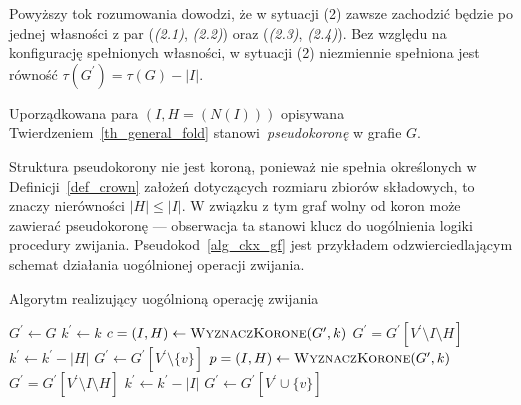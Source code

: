 {\begin{bproof}
\begin{itemize}
      Powyższy tok rozumowania dowodzi, że w sytuacji (2) zawsze zachodzić będzie po jednej własności z par (\textit{(2.1)}, \textit{(2.2)}) oraz (\textit{(2.3)}, \textit{(2.4)}).
      Bez względu na konfigurację spełnionych własności, w sytuacji (2) niezmiennie spełniona jest równość $\tau(G^\prime)=\tau(G)-|I|$.
    \end{itemize}
  \end{bproof}

  \begin{definition}
    Uporządkowana para $(I, H=(N(I)))$ opisywana Twierdzeniem~\ref{th_general_fold} stanowi~\emph{pseudokoronę} w grafie $G$.
  \end{definition}

  Struktura pseudokorony nie jest koroną, ponieważ nie spełnia określonych w Definicji~\ref{def_crown} założeń dotyczących rozmiaru zbiorów składowych, to znaczy nierówności $|H| \leq |I|$.
  W związku z tym graf wolny od koron może zawierać pseudokoronę --- obserwacja ta stanowi klucz do uogólnienia logiki procedury zwijania.
  Pseudokod~\ref{alg_ckx_gf} jest przykładem odzwierciedlającym schemat działania uogólnionej operacji zwijania.
  \begin{algorithm}
    \caption{Algorytm realizujący uogólnioną operację zwijania}\label{alg_ckx_gf}
    \begin{algorithmic}[1]


        \State $G^\prime \gets G$
        \State $k^\prime \gets k$
        \State $c=(I, H) \gets \Call{WyznaczKorone}{G^\prime, k}$
          \State $G^\prime = G^\prime[V^\prime \setminus I \setminus H]$
          \State $k^\prime \gets k^\prime - |H|$
        \EndWhile
          \State $G^\prime \gets G^\prime[V^\prime \setminus \{v\}]$
          \State $p=(I, H) \gets \Call{WyznaczKorone}{G^\prime, k}$
            \State $G^\prime = G^\prime[V^\prime \setminus I \setminus H]$
            \State $k^\prime \gets k^\prime - |I|$
          \EndIf
          \State $G^\prime \gets G^\prime[V^\prime \cup \{v\}]$
        \EndFor
      \EndFunction
    \end{algorithmic}
  \end{algorithm}
}

